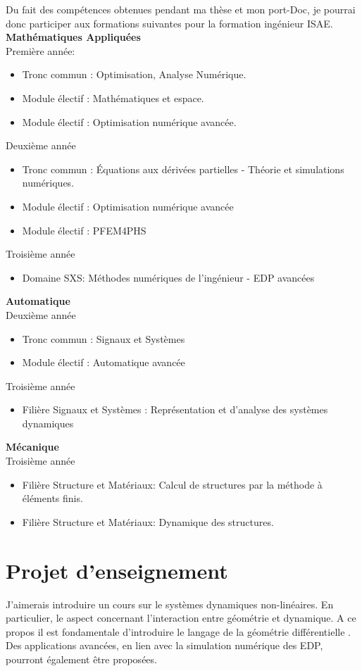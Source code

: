 \documentclass[12pt, french]{article}
\begin{document}
Du fait des compétences obtenues pendant ma thèse et mon port-Doc, je pourrai donc participer aux formations suivantes pour la formation ingénieur ISAE. \\

\textbf{Mathématiques Appliquées} \\
Première année: 
\begin{itemize}
	\item Tronc commun : Optimisation, Analyse Numérique.
	\item Module électif : Mathématiques et espace.
	\item  Module électif : Optimisation numérique avancée.
\end{itemize}
Deuxième année
\begin{itemize}
	\item Tronc commun : Équations aux dérivées partielles - Théorie et simulations numériques.
	\item Module électif : Optimisation numérique avancée
	\item Module électif : PFEM4PHS
\end{itemize}
Troisième année
\begin{itemize}
	\item Domaine SXS: Méthodes numériques de l'ingénieur - EDP avancées
\end{itemize}

\textbf{Automatique} \\ 
Deuxième année
\begin{itemize}
	\item Tronc commun : Signaux et Systèmes
	\item Module électif : Automatique avancée
\end{itemize}
Troisième année
\begin{itemize}
	\item Filière Signaux et Systèmes :  Représentation et d'analyse des systèmes dynamiques
\end{itemize}

\textbf{Mécanique} \\
Troisième année
\begin{itemize}
	\item Filière Structure et Matériaux: Calcul de structures par la méthode à éléments finis.
	\item Filière Structure et Matériaux: Dynamique des structures.
\end{itemize}


\section{Projet d'enseignement}
J'aimerais introduire un cours sur le systèmes dynamiques non-linéaires. En particulier, le aspect concernant l'interaction entre géométrie et dynamique. A ce propos il est fondamentale d'introduire le langage de la géométrie différentielle \cite{wiggins2003introduction,haddad2011nonlinear}. Des applications avancées, en lien avec la simulation numérique des EDP, pourront également être proposées.


	
	
	
	
\end{document}
